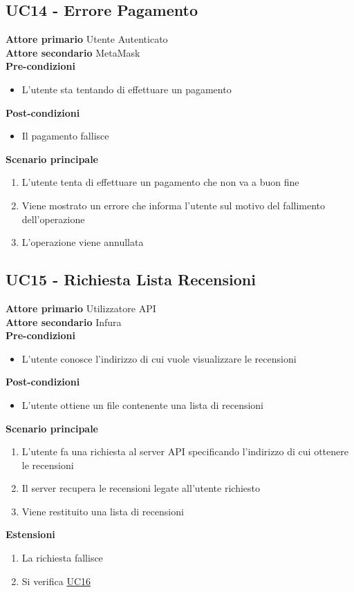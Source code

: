 \subsection{UC14 - Errore Pagamento}
\label{UC14}
\textbf{Attore primario} Utente Autenticato \\
\textbf{Attore secondario} MetaMask \\
\textbf{Pre-condizioni}
\begin{itemize}
    \item L'utente sta tentando di effettuare un pagamento
\end{itemize}
\textbf{Post-condizioni}
\begin{itemize}
    \item Il pagamento fallisce
\end{itemize}
\textbf{Scenario principale}
\begin{enumerate}
    \item L'utente tenta di effettuare un pagamento che non va a buon fine
    \item Viene mostrato un errore che informa l'utente sul motivo del fallimento
          dell'operazione
    \item L'operazione viene annullata
\end{enumerate}

\subsection{UC15 - Richiesta Lista Recensioni}
\label{UC15}
\textbf{Attore primario} Utilizzatore API \\
\textbf{Attore secondario} Infura \\
\textbf{Pre-condizioni}
\begin{itemize}
    \item L'utente conosce l'indirizzo di cui vuole visualizzare le recensioni
\end{itemize}
\textbf{Post-condizioni}
\begin{itemize}
    \item L'utente ottiene un file contenente una lista di recensioni
\end{itemize}
\textbf{Scenario principale}
\begin{enumerate}
    \item L'utente fa una richiesta al server API specificando l'indirizzo di cui
          ottenere le recensioni
    \item Il server recupera le recensioni legate all'utente richiesto
    \item Viene restituito una lista di recensioni
\end{enumerate}
\textbf{Estensioni}
\begin{enumerate}
    \item La richiesta fallisce
    \item Si verifica \hyperref[UC16]{UC16}
\end{enumerate}

